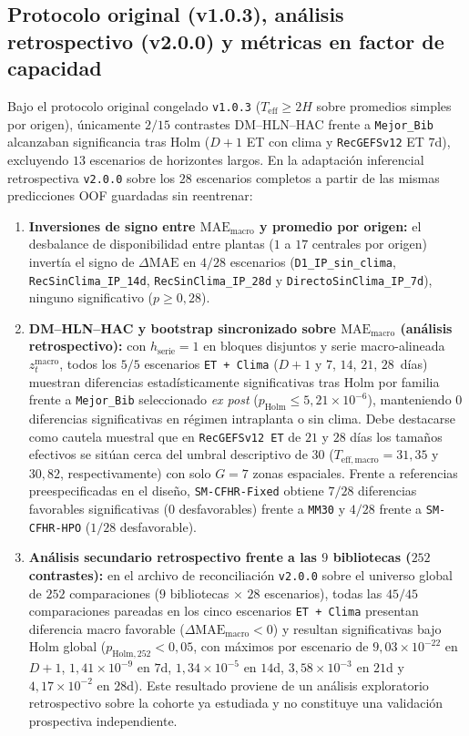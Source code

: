 \subsection{Protocolo original (v1.0.3), análisis retrospectivo (v2.0.0) y métricas en factor de capacidad}

Bajo el protocolo original congelado \texttt{v1.0.3} ($T_{\mathrm{eff}} \ge 2H$ sobre promedios simples por origen), únicamente $2/15$ contrastes DM--HLN--HAC frente a \texttt{Mejor\_Bib} alcanzaban significancia tras Holm ($D+1$ ET con clima y \texttt{RecGEFSv12} ET $7$d), excluyendo $13$ escenarios de horizontes largos. En la adaptación inferencial retrospectiva \texttt{v2.0.0} sobre los $28$ escenarios completos a partir de las mismas predicciones OOF guardadas sin reentrenar:
\begin{enumerate}
    \item \textbf{Inversiones de signo entre $\mathrm{MAE}_{\mathrm{macro}}$ y promedio por origen:} el desbalance de disponibilidad entre plantas ($1$ a $17$ centrales por origen) invertía el signo de $\Delta\mathrm{MAE}$ en $4/28$ escenarios (\texttt{D1\_IP\_sin\_clima}, \texttt{RecSinClima\_IP\_14d}, \texttt{RecSinClima\_IP\_28d} y \texttt{DirectoSinClima\_IP\_7d}), ninguno significativo ($p \ge 0{,}28$).
    \item \textbf{DM--HLN--HAC y bootstrap sincronizado sobre $\mathrm{MAE}_{\mathrm{macro}}$ (análisis retrospectivo):} con $h_{\mathrm{serie}}=1$ en bloques disjuntos y serie macro-alineada $z_t^{\mathrm{macro}}$, todos los $5/5$ escenarios \texttt{ET + Clima} ($D+1$ y $7$, $14$, $21$, $28$~días) muestran diferencias estadísticamente significativas tras Holm por familia frente a \texttt{Mejor\_Bib} seleccionado \textit{ex post} ($p_{\mathrm{Holm}} \le 5{,}21\times 10^{-6}$), manteniendo $0$ diferencias significativas en régimen intraplanta o sin clima. Debe destacarse como cautela muestral que en \texttt{RecGEFSv12 ET} de $21$ y $28$ días los tamaños efectivos se sitúan cerca del umbral descriptivo de $30$ ($T_{\mathrm{eff,macro}} = 31{,}35$ y $30{,}82$, respectivamente) con solo $G=7$ zonas espaciales. Frente a referencias preespecificadas en el diseño, \texttt{SM-CFHR-Fixed} obtiene $7/28$ diferencias favorables significativas ($0$ desfavorables) frente a \texttt{MM30} y $4/28$ frente a \texttt{SM-CFHR-HPO} ($1/28$ desfavorable).
    \item \textbf{Análisis secundario retrospectivo frente a las $9$ bibliotecas ($252$ contrastes):} en el archivo de reconciliación \texttt{v2.0.0} sobre el universo global de $252$ comparaciones ($9$ bibliotecas $\times$ $28$ escenarios), todas las $45/45$ comparaciones pareadas en los cinco escenarios \texttt{ET + Clima} presentan diferencia macro favorable ($\Delta\mathrm{MAE}_{\mathrm{macro}} < 0$) y resultan significativas bajo Holm global ($p_{\mathrm{Holm,252}} < 0{,}05$, con máximos por escenario de $9{,}03\times 10^{-22}$ en $D+1$, $1{,}41\times 10^{-9}$ en $7$d, $1{,}34\times 10^{-5}$ en $14$d, $3{,}58\times 10^{-3}$ en $21$d y $4{,}17\times 10^{-2}$ en $28$d). Este resultado proviene de un análisis exploratorio retrospectivo sobre la cohorte ya estudiada y no constituye una validación prospectiva independiente.

\end{enumerate}
